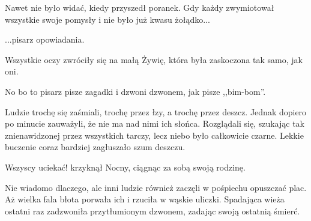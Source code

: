 Nawet nie było widać, kiedy przyszedł poranek.
Gdy każdy zwymiotował wszystkie swoje pomysły i nie było już kwasu żołądko...
\begin{dialogue}
	\ds{} ...pisarz opowiadania.
\end{dialogue}
Wszystkie oczy zwróciły się na małą Żywię, która była zaskoczona tak samo, jak oni.
\begin{dialogue}
	\ds{} No bo to pisarz pisze zagadki i dzwoni dzwonem, jak pisze ,,bim-bom''.
\end{dialogue}
Ludzie trochę się zaśmiali, trochę przez łzy, a trochę przez deszcz.
Jednak dopiero po minucie zauważyli, że nie ma nad nimi ich słońca.
Rozglądali się, szukając tak znienawidzonej przez wszystkich tarczy, lecz niebo było całkowicie czarne.
Lekkie buczenie coraz bardziej zagłuszało szum deszczu.
\begin{dialogue}
	\ds{} Wszyscy uciekać! \dm{} krzyknął Nocny, ciągnąc za sobą swoją rodzinę.
\end{dialogue}
Nie wiadomo dlaczego, ale inni ludzie również zaczęli w pośpiechu opuszczać plac.
Aż wielka fala błota porwała ich i rzuciła w wąskie uliczki.
Spadająca wieża ostatni raz zadzwoniła przytłumionym dzwonem, zadając swoją ostatnią śmierć.


















